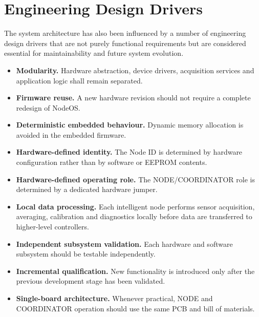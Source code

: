 \section{Engineering Design Drivers}

The system architecture has also been influenced by a number of engineering design drivers that are not purely functional requirements but are considered essential for maintainability and future system evolution.

\begin{itemize}[leftmargin=*]
	
	\item \textbf{Modularity.}
	Hardware abstraction, device drivers, acquisition services and application logic shall remain separated.
	
	\item \textbf{Firmware reuse.}
	A new hardware revision should not require a complete redesign of NodeOS.
	
	\item \textbf{Deterministic embedded behaviour.}
	Dynamic memory allocation is avoided in the embedded firmware.
	
	\item \textbf{Hardware-defined identity.}
	The Node ID is determined by hardware configuration rather than by software or EEPROM contents.
	
	\item \textbf{Hardware-defined operating role.}
	The NODE/COORDINATOR role is determined by a dedicated hardware jumper.
	
	\item \textbf{Local data processing.}
	Each intelligent node performs sensor acquisition, averaging, calibration and diagnostics locally before data are transferred to higher-level controllers.
	
	\item \textbf{Independent subsystem validation.}
	Each hardware and software subsystem should be testable independently.
	
	\item \textbf{Incremental qualification.}
	New functionality is introduced only after the previous development stage has been validated.
	
	\item \textbf{Single-board architecture.}
	Whenever practical, NODE and COORDINATOR operation should use the same PCB and bill of materials.
	
\end{itemize}


